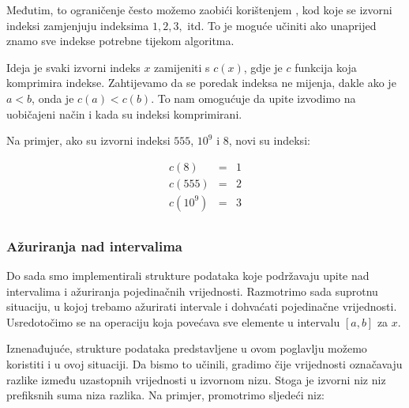 
Međutim, to ograničenje često možemo zaobići
korištenjem ,
kod koje se izvorni indeksi zamjenjuju
indeksima $1,2,3,$ itd.
To je moguće učiniti ako unaprijed znamo sve indekse
potrebne tijekom algoritma.

Ideja je svaki izvorni indeks $x$
zamijeniti s $c(x)$, gdje je $c$ funkcija koja
komprimira indekse.
Zahtijevamo da se poredak indeksa
ne mijenja, dakle ako je $a<b$, onda je $c(a)<c(b)$.
To nam omogućuje da upite izvodimo na uobičajeni način
i kada su indeksi komprimirani.

Na primjer, ako su izvorni indeksi
$555$, $10^9$ i $8$, novi su indeksi:

\[
\begin{array}{lcl}
c(8) & = & 1 \\
c(555) & = & 2 \\
c(10^9) & = & 3 \\
\end{array}
\]

\subsubsection{Ažuriranja nad intervalima}

Do sada smo implementirali strukture podataka
koje podržavaju upite nad intervalima i ažuriranja
pojedinačnih vrijednosti.
Razmotrimo sada suprotnu situaciju,
u kojoj trebamo ažurirati intervale i
dohvaćati pojedinačne vrijednosti.
Usredotočimo se na operaciju koja povećava sve
elemente u intervalu $[a,b]$ za $x$.


Iznenađujuće, strukture podataka predstavljene
u ovom poglavlju možemo koristiti i u ovoj situaciji.
Da bismo to učinili, gradimo 
čije vrijednosti označavaju
razlike između uzastopnih vrijednosti
u izvornom nizu.
Stoga je izvorni niz
niz prefiksnih suma
niza razlika.
Na primjer, promotrimo sljedeći niz:

\begin{center}
\end{center}

